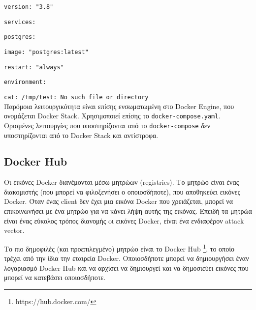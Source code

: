 \texttt{\textlatin{version: "3.8"}}

\texttt{\textlatin{services:}}

\texttt{\textlatin{postgres:}}

\texttt{\textlatin{image: "postgres:latest"}}

\texttt{\textlatin{restart: "always"}}

\texttt{\textlatin{environment:}}

\texttt{\textlatin{cat: /tmp/test: No such file or directory}} \\

Παρόμοια λειτουργικότητα είναι επίσης ενσωματωμένη στο
\textlatin{Docker Engine}, που ονομάζεται \textlatin{Docker Stack}.
Χρησιμοποιεί επίσης το \texttt{\textlatin{docker-compose.yaml}}. Ορισμένες
λειτουργίες που υποστηρίζονται από το \texttt{\textlatin{docker-compose}} δεν
υποστηρίζονται από το \textlatin{Docker Stack} και αντίστροφα.


\subsection{\textlatin{Docker Hub}}

Οι εικόνες \textlatin{Docker} διανέμονται μέσω μητρώων (\textlatin{registries}).
Το μητρώο είναι ένας διακομιστής (που μπορεί να φιλοξενήσει ο οποιοσδήποτε),
που αποθηκεύει εικόνες Docker. Όταν ένας \textlatin{client} δεν έχει μια εικόνα
\textlatin{Docker} που χρειάζεται, μπορεί να επικοινωνήσει με ένα μητρώο για να
κάνει λήψη αυτής της εικόνας. Επειδή τα μητρώα είναι ένας εύκολος τρόπος
διανομής oι εικόνες \textlatin{Docker}, είναι ένα ενδιαφέρον
\textlatin{attack vector}.

Το πιο δημοφιλές (και προεπιλεγμένο) μητρώο είναι το \textlatin{Docker Hub}
\footnote{\textlatin{https://hub.docker.com/}}, το οποίο τρέχει
από την ίδια την εταιρεία \textlatin{Docker}. Οποιοσδήποτε μπορεί να
δημιουργήσει έναν λογαριασμό \textlatin{Docker Hub} και να αρχίσει να
δημιουργεί και να δημοσιεύει εικόνες που μπορεί να κατεβάσει οποιοσδήποτε.
